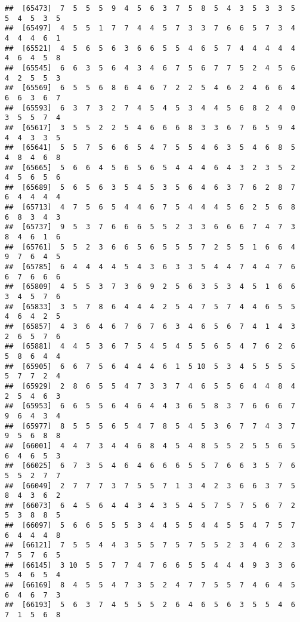 \documentclass[
]{book}
\begin{document}
\begin{verbatim}
##  [65473]  7  5  5  5  9  4  5  6  3  7  5  8  5  4  3  5  3  3  5  5  4  5  3  5
##  [65497]  4  5  5  1  7  7  4  4  5  7  3  3  7  6  6  5  7  3  4  4  4  4  6  1
##  [65521]  4  5  6  5  6  3  6  6  5  5  4  6  5  7  4  4  4  4  4  4  6  4  5  8
##  [65545]  6  6  3  5  6  4  3  4  6  7  5  6  7  7  5  2  4  5  6  4  2  5  5  3
##  [65569]  6  5  5  6  8  6  4  6  7  2  2  5  4  6  2  4  6  6  4  6  6  3  6  7
##  [65593]  6  3  7  3  2  7  4  5  4  5  3  4  4  5  6  8  2  4  0  3  5  5  7  4
##  [65617]  3  5  5  2  2  5  4  6  6  6  8  3  3  6  7  6  5  9  4  4  4  3  3  5
##  [65641]  5  5  7  5  6  6  5  4  7  5  5  4  6  3  5  4  6  8  5  4  8  4  6  8
##  [65665]  5  6  6  4  5  6  5  6  5  4  4  4  6  4  3  2  3  5  2  4  5  6  5  6
##  [65689]  5  6  5  6  3  5  4  5  3  5  6  4  6  3  7  6  2  8  7  6  4  4  4  4
##  [65713]  4  7  5  6  5  4  4  6  7  5  4  4  4  5  6  2  5  6  8  6  8  3  4  3
##  [65737]  9  5  3  7  6  6  6  5  5  2  3  3  6  6  6  7  4  7  3  8  4  6  1  6
##  [65761]  5  5  2  3  6  6  5  6  5  5  5  7  2  5  5  1  6  6  4  9  7  6  4  5
##  [65785]  6  4  4  4  4  5  4  3  6  3  3  5  4  4  7  4  4  7  6  6  7  6  6  6
##  [65809]  4  5  5  3  7  3  6  9  2  5  6  3  5  3  4  5  1  6  6  3  4  5  7  6
##  [65833]  3  5  7  8  6  4  4  4  2  5  4  7  5  7  4  4  6  5  5  4  6  4  2  5
##  [65857]  4  3  6  4  6  7  6  7  6  3  4  6  5  6  7  4  1  4  3  2  6  5  7  6
##  [65881]  4  4  5  3  6  7  5  4  5  4  5  5  6  5  4  7  6  2  6  5  8  6  4  4
##  [65905]  6  6  7  5  6  4  4  4  6  1  5 10  5  3  4  5  5  5  5  5  7  7  2  4
##  [65929]  2  8  6  5  5  4  7  3  3  7  4  6  5  5  6  4  4  8  4  2  5  4  6  3
##  [65953]  6  6  5  5  6  4  6  4  4  3  6  5  8  3  7  6  6  6  7  9  6  4  3  4
##  [65977]  8  5  5  5  6  5  4  7  8  5  4  5  3  6  7  7  4  3  7  9  5  6  8  8
##  [66001]  4  4  7  3  4  4  6  8  4  5  4  8  5  5  2  5  5  6  5  6  4  6  5  3
##  [66025]  6  7  3  5  4  6  4  6  6  6  5  5  7  6  6  3  5  7  6  5  5  2  7  7
##  [66049]  2  7  7  7  3  7  5  5  7  1  3  4  2  3  6  6  3  7  5  8  4  3  6  2
##  [66073]  6  4  5  6  4  4  3  4  3  5  4  5  7  5  7  5  6  7  2  5  3  8  8  5
##  [66097]  5  6  6  5  5  5  3  4  4  5  5  4  4  5  5  4  7  5  7  6  4  4  4  8
##  [66121]  7  5  5  4  4  3  5  5  7  5  7  5  5  2  3  4  6  2  3  7  5  7  6  5
##  [66145]  3 10  5  5  7  7  4  7  6  6  5  5  4  4  4  9  3  3  6  5  4  6  5  4
##  [66169]  8  4  5  5  4  7  3  5  2  4  7  7  5  5  7  4  6  4  5  6  4  6  7  3
##  [66193]  5  6  3  7  4  5  5  5  2  6  4  6  5  6  3  5  5  4  6  7  1  5  6  8

\end{verbatim}
\end{document}
